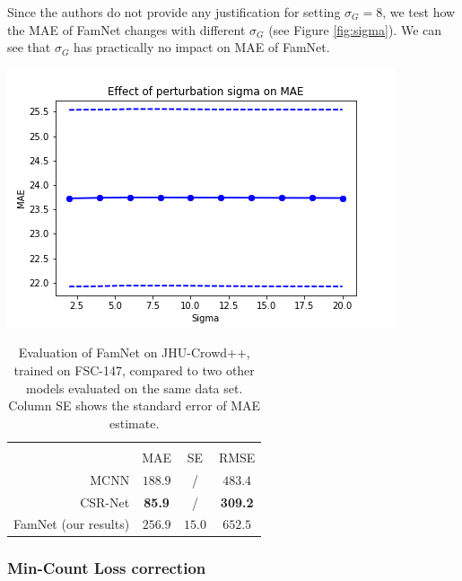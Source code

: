 Since the authors do not provide any justification for setting $\sigma_G = 8$, we test how the MAE of FamNet changes with different $\sigma_G$ (see Figure \ref{fig:sigma}). We can see that $\sigma_G$ has practically no impact on MAE of FamNet.

\begin{table}[tb]
	\begin{minipage}{0.49\linewidth}
		\centering
		\includegraphics[width=0.9\linewidth]{fig/sigma.png}
		\label{fig:sigma}
	\end{minipage}
	\begin{minipage}{0.49\linewidth}
		\small
		\centering
		\caption{Evaluation of FamNet on JHU-Crowd++, trained on FSC-147, compared to two other models evaluated on the same data set. Column SE shows the standard error of MAE estimate.}
		\label{tab:results_jhu_crowd}
		\begin{tabular}{r|cc:c} \toprule  \\
			& MAE & SE & RMSE \\\midrule
			MCNN & $188.9$ & / & $483.4$ \\
			CSR-Net & \textbf{85.9} & / & \textbf{309.2} \\\midrule
			FamNet (our results) & $256.9$ & $15.0$ & $652.5$ \\ \bottomrule
		\end{tabular}
	\end{minipage}
\end{table}

\subsubsection{Min-Count Loss correction}

